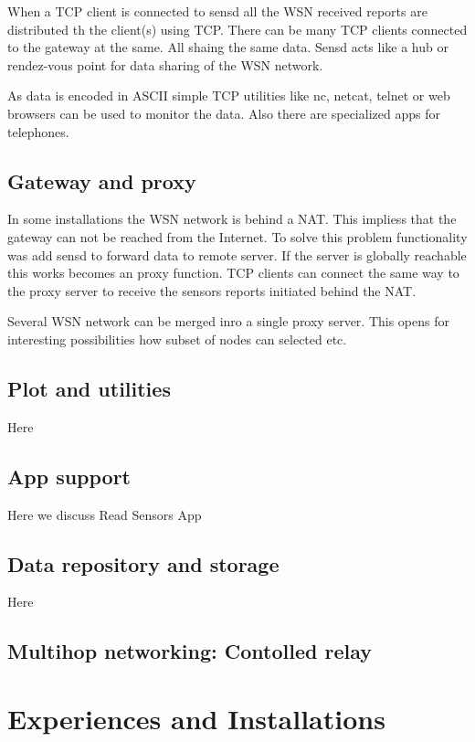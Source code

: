 \documentclass[conference, a4paper,10pt,twocolumn]{IEEEtran}
\begin{document}
When a TCP client is connected to sensd all the WSN received reports  
are distributed th the client(s) using TCP. There can be many TCP 
clients connected to the gateway at the same. All shaing the same data.
Sensd acts like a hub or rendez-vous point for data sharing of the 
WSN network.

As data is encoded in ASCII simple TCP utilities like nc, netcat, 
telnet or web browsers can be used to monitor the data. Also there 
are specialized apps for telephones. 

\subsection{Gateway and proxy}
In some installations the WSN network is behind a NAT. 
This impliess that the gateway can not be reached from 
the Internet. To solve this problem functionality was 
add sensd to forward data to remote server.
If the server is globally reachable this works becomes an
proxy function. TCP clients can connect the same way to 
the proxy server to receive the sensors reports initiated 
behind the NAT.

Several WSN network can be merged inro a single proxy server. 
This opens for interesting possibilities how subset of nodes 
can selected etc.

\subsection{Plot and utilities}
Here

\subsection{App support}
Here we discuss Read Sensors App  ~\cite{read-sensors}

\subsection{Data repository and storage}
Here

\subsection{Multihop networking: Contolled relay}

\section{Experiences and Installations}
\label{sec:experince}
\end{document}
